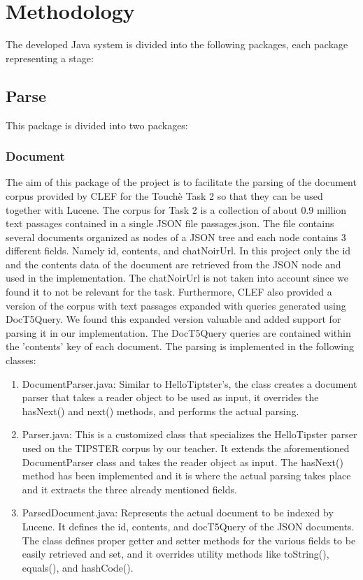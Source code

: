 \section{Methodology}
\label{sec:methodology}

The developed Java system is divided into the following packages, each package representing a stage:


\subsection{Parse}
  
  This package is divided into two packages: 
\subsubsection{Document}
        
            The aim of this package of the project is to facilitate the parsing of the document corpus provided by CLEF for the Touchè Task 2 so that they can be used together with Lucene. The corpus for Task 2 is a collection of about 0.9 million text passages contained in a single JSON file passages.json. The file contains several documents organized as nodes of a JSON tree and each node contains 3 different fields. Namely id, contents, and chatNoirUrl. In this project only the id and the contents data of the document are retrieved from the JSON node and used in the implementation. The chatNoirUrl is not taken into account since we found it to not be relevant for the task. Furthermore, CLEF also provided a version of the corpus with text passages expanded with queries generated using DocT5Query. We found this expanded version valuable and added support for parsing it in our implementation. The DocT5Query queries are contained within the 'contents' key of each document. The parsing is implemented in the following classes:
            \begin{enumerate}
                \item 
                    DocumentParser.java: Similar to HelloTiptster’s, the class creates a     document parser that takes a reader object to be used as input, it overrides the hasNext() and next() methods, and performs the actual parsing.
                \item 
                    Parser.java: This is a customized class that specializes the HelloTipster parser used on the TIPSTER corpus by our teacher. It extends the aforementioned DocumentParser class and takes the reader object as input. The hasNext() method has been implemented and it is where the actual parsing takes place and it extracts the three already mentioned fields.
                \item
                    ParsedDocument.java: Represents the actual document to be indexed by Lucene. It defines the id, contents, and docT5Query of the JSON documents. The class defines proper getter and setter methods for the various fields to be easily retrieved and set, and it overrides utility methods like toString(), equals(), and hashCode().
            \end{enumerate}
